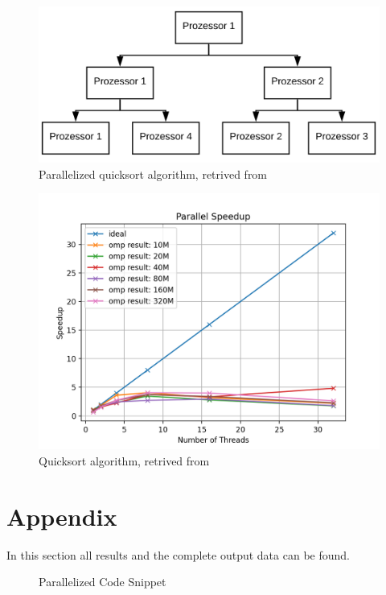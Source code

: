 \documentclass[unicode,11pt,a4paper,oneside,numbers=endperiod,openany]{scrartcl}
\begin{document}
\begin{figure}[H]
  \centering
  \includegraphics[width=\textwidth]{Images_Output/Parallel_Quicksort.png}
  \caption{Parallelized quicksort algorithm, retrived from \cite{parallelized_quicksort}}
  \label{fig:parallel_quicksort}
\end{figure}

\begin{figure}[H]
  \centering
  \includegraphics[width=\textwidth]{Images_Output/qicksort_tot_plot.png}
  \caption{Quicksort algorithm, retrived from \cite{parallelized_quicksort}}
  \label{fig:quicksort}
\end{figure}

\newpage
\section{Appendix}%
In this section all results and the complete output data can be found.

\begin{figure}[H]
  \centering
  {\fontsize{8}{10}\selectfont
  }
  \caption{Parallelized Code Snippet}
  \label{fig:slurm_euler_2}
\end{figure}
\end{document}
